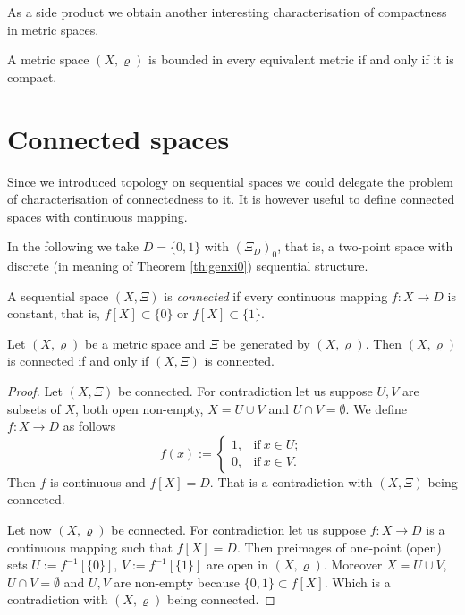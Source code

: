 As a side product we obtain another interesting characterisation of compactness in metric spaces.

\begin{corollary} \label{cr:bdcomp}
A metric space $(X,\varrho)$ is bounded in every equivalent metric if and only if it is compact.
\end{corollary}

\section{Connected spaces}

Since we introduced topology on sequential spaces we could delegate the problem of characterisation of connectedness to it. It is however useful to define connected spaces with continuous mapping.

In the following we take $D=\{0,1\}$ with $(\Xi_D)_0$, that is, a two-point space with discrete (in meaning of Theorem \ref{th:genxi0}) sequential structure.

\begin{define}\label{def:conn}
A sequential space $(X,\Xi)$ is \emph{connected} if every continuous mapping $f:X\to D$ is constant, that is, $f[X]\subset\{0\}$ or $f[X]\subset\{1\}$.
\end{define}

\begin{theorem} \label{th:conneq}
Let $(X,\varrho)$ be a metric space and $\Xi$ be generated by $(X,\varrho)$. Then $(X,\varrho)$ is connected if and only if $(X,\Xi)$ is connected.
\end{theorem}
\begin{proof}
Let $(X,\Xi)$ be connected. For contradiction let us suppose $U,V$ are subsets of $X$, both open non-empty, $X=U\cup V$ and $U\cap V=\emptyset$. We define $f:X\to D$ as follows
\[
	f(x):= \left\{ \begin{array}{ll}1, & \mathrm{if}\ x\in U; \\ 0, & \mathrm{if}\ x\in V. \end{array} \right.
\]
Then $f$ is continuous and $f[X]=D$. That is a contradiction with $(X,\Xi)$ being connected.

Let now $(X,\varrho)$ be connected. For contradiction let us suppose $f:X\to D$ is a continuous mapping such that $f[X]=D$. Then preimages of one-point (open) sets $U:=f^{-1}[\{0\}]$, $V:=f^{-1}[\{1\}]$ are open in $(X,\varrho)$. Moreover $X=U\cup V$, $U\cap V=\emptyset$ and $U,V$ are non-empty because $\{0,1\}\subset f[X]$. Which is a contradiction with $(X,\varrho)$ being connected.
\end{proof}
